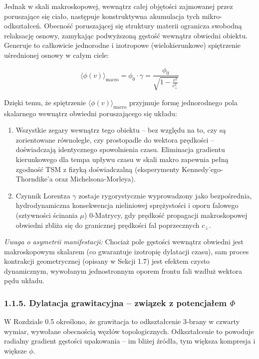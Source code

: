 \documentclass[
  letterpaper,
  DIV=11,
  numbers=noendperiod]{scrartcl}
\providecommand{\tightlist}{%
  \setlength{\itemsep}{0pt}\setlength{\parskip}{0pt}}
\numberwithin{equation}{subsection}
\begin{document}
Jednak w skali makroskopowej, wewnątrz całej objętości zajmowanej przez
poruszające się ciało, następuje konstruktywna akumulacja tych
mikro-odkształceń. Obecność poruszającej się struktury materii ogranicza
swobodną relaksację osnowy, zamykając podwyższoną gęstość wewnątrz
obwiedni obiektu. Generuje to całkowicie jednorodne i izotropowe
(wielokierunkowe) spiętrzenie uśrednionej osnowy w całym ciele:

\[\langle\phi(v)\rangle_{\text{macro}} = \phi_0 \cdot \gamma = \frac{\phi_0}{\sqrt{1 - \frac{v^2}{c_{\perp}^2}}} \tag{1.1.3}\]

Dzięki temu, że spiętrzenie \(\langle\phi(v)\rangle_{\text{macro}}\)
przyjmuje formę jednorodnego pola skalarnego wewnątrz obwiedni
poruszającego się układu:

\begin{enumerate}
\def\labelenumi{\arabic{enumi}.}
\tightlist
\item
  Wszystkie zegary wewnątrz tego obiektu -- bez względu na to, czy są
  zorientowane równolegle, czy prostopadle do wektora prędkości --
  doświadczają identycznego spowolnienia czasu. Eliminacja gradientu
  kierunkowego dla tempa upływu czasu w skali makro zapewnia pełną
  zgodność TSM z fizyką doświadczalną (eksperymenty
  Kennedy'ego-Thorndike'a oraz Michelsona-Morleya).
\item
  Czynnik Lorentza \(\gamma\) zostaje rygorystycznie wyprowadzony jako
  bezpośrednia, hydrodynamiczna konsekwencja nieliniowej sprężystości i
  oporu falowego (sztywności ścinania \(\mu\)) 0-Matrycy, gdy prędkość
  propagacji makroskopowej obwiedni zbliża się do granicznej prędkości
  fal poprzecznych \(c_{\perp}\).
\end{enumerate}

\emph{Uwaga o asymetrii manifestacji:} Chociaż pole gęstości wewnątrz
obwiedni jest makroskopowym skalarem (co gwarantuje izotropię dylatacji
czasu), sam proces kontrakcji geometrycznej (opisany w Sekcji 1.7) jest
efektem czysto dynamicznym, wywołanym jednostronnym oporem frontu fali
wzdłuż wektora pędu układu.

\subsubsection{\texorpdfstring{1.1.5. Dylatacja grawitacyjna -- związek
z potencjałem
\(\Phi\)}{1.1.5. Dylatacja grawitacyjna -- związek z potencjałem \textbackslash Phi}}\label{dylatacja-grawitacyjna-zwiux105zek-z-potencjaux142em-phi}

W Rozdziale 0.5 określono, że grawitacja to odkształcenie 3‑brany w
czwarty wymiar, wywołane obecnością węzłów topologicznych. Odkształcenie
to powoduje radialny gradient gęstości upakowania -- im bliżej źródła,
tym większa kompresja i większe \(\phi\).
\end{document}
